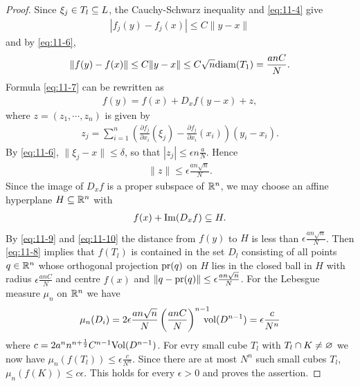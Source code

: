 \begin{proof}
  Since $\xi_j\in T_l\subseteq L$, the Cauchy-Schwarz inequality and \eqref{eq:11-4} give
  \begin{align*}
    |f_j(y) - f_j(x)| \le C\|y-x\|
  \end{align*}
  and by \eqref{eq:11-6}, 
  \begin{align}\label{eq:11-8}
    \|f(y) - f(x)\| \le C\|y-x\| \le C\sqrt{n}\mathrm{diam}(T_1) = \frac{anC}{N}.
  \end{align}
  Formula \eqref{eq:11-7} can be rewritten as
  \begin{align}\label{eq:11-9}
    f(y) = f(x) + D_x f(y-x) + z,
  \end{align}
  where $z = (z_1, \cdots, z_n)$ is given by 
  \begin{align*}
    z_j = \sum_{i=1}^{n }{\left(\frac{\partial f_j }{\partial x_i }(\xi_j) - \frac{\partial f_j }{\partial x_i }(x_i)\right) (y_i - x_i)}.
  \end{align*}
  By \eqref{eq:11-6}, $\|\xi_j-x\|\le \delta$, so that $|z_j|\le \epsilon n\frac aN$. Hence 
  \begin{align}\label{eq:11-10}
    \|z\| \le \epsilon \frac{an\sqrt{n}}{N}.
  \end{align}
  Since the image of $D_xf$ is a proper subspace of $\mathbb{R}^n$, we may choose an affine
  hyperplane $H\subseteq \mathbb{R}^n$ with
  \begin{align*}
    f(x) + \operatorname{Im} (D_xf)\subseteq H.
  \end{align*}
  By \eqref{eq:11-9} and \eqref{eq:11-10} the distance from $f(y)$ to $H$ is less than $\epsilon \frac{an\sqrt{n}}{N}$. 
  Then \eqref{eq:11-8} implies that $f(T_l)$ is contained in the set $D_l$ consisting of all points $q\in\mathbb{R}^n$ whose
  orthogonal projection $\mathrm{pr}(q)$ on $H$ lies in the closed ball in $H$ with radius $\epsilon \frac{anC}{N}$
  and centre $f(x)$ and $\|q-\mathrm{pr}(q)\|\le \epsilon \frac{an\sqrt{n}}{N}$. For the Lebesgue measure $\mu_n$ on $\mathbb{R}^n$
  we have
  \begin{align*}
    \mu_n(D_i) 
      = 2\epsilon \frac{an\sqrt{n}}{N} \left(\frac{anC }{N }\right)^{n-1}
        \mkern-15mu\mathrm{vol}(D^{n-1})
      = \epsilon \frac{c}{N^n}
  \end{align*}
  where $c = 2a^nn^{n+\frac12}C^{n-1}\mathrm{Vol}(D^{n-1})$. For evry small cube $T_l$ with $T_l\cap K\neq\varnothing$
  we now have $\mu_n(f(T_l))\le \epsilon\frac{c}{N^n}$. Since there are at most $N^n$ such small cubes $T_l$,
  $\mu_n(f(K))\le c\epsilon$. This holds for every $\epsilon>0$ and proves the assertion.
\end{proof}


